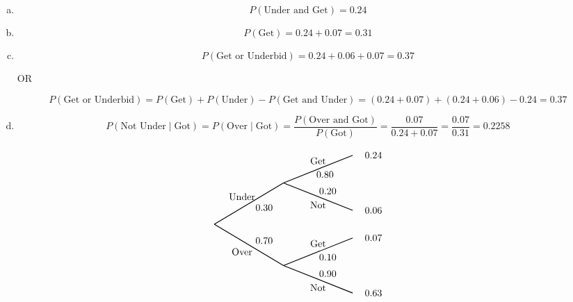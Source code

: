 \documentclass[11pt,letterpaper]{article}
\begin{document}
\sol
\begin{enumerate}[(a)]
\item 
	\[
	P(\text{Under and Get})= 0.24 
	\] \pspace

\item 
	\[
	P(\text{Get})= 0.24 + 0.07= 0.31
	\] \pspace

\item 
	\[
	P(\text{Get or Underbid})= 0.24 + 0.06 + 0.07= 0.37
	\]
		\begin{center} OR \end{center}
	\[
	P(\text{Get or Underbid})= P(\text{Get}) + P(\text{Under}) - P(\text{Get and Under})= (0.24 + 0.07) + (0.24 + 0.06) - 0.24= 0.37
	\] \pspace

\item 
	\[
	P(\text{Not Under} \;|\; \text{Got})= P(\text{Over} \;|\; \text{Got})= \dfrac{P(\text{Over and Got})}{P(\text{Got})}= \dfrac{0.07}{0.24 + 0.07}= \dfrac{0.07}{0.31}= 0.2258
	\]
\end{enumerate} \pspace

		\[
		\begin{tikzpicture}[scale= 1.0]
		\def\FirstUpLabel{Under}
		\def\FirstDownLabel{Over}
		\def\SecondUpLabel{Get}
		\def\SecondDownLabel{Not}
		\def\Up{$0.30$}
		\def\Down{$0.70$}
		\def\UpUp{$0.80$}
		\def\UpDown{$0.20$}
		\def\DownUp{$0.10$}
		\def\DownDown{$0.90$}
		\def\first{$0.24$}
		\def\second{$0.06$}
		\def\third{$0.07$}
		\def\fourth{$0.63$}
		
		\node at (1,1) {\FirstUpLabel};	
		\node at (1,-1) {\FirstDownLabel};	
		\node at (1.8,0.6) {\Up};
		\node at (1.8,-0.6) {\Down};
		\draw[thick] (0,0) -- (2.5,1.5);
		\draw[thick] (0,0) -- (2.5,-1.5);
		
		\node at (3.75,2.3) {\SecondUpLabel};
		\node at (3.75,0.7) {\SecondDownLabel};
		\node at (4,1.8) {\UpUp};
		\node at (4.1,1.2) {\UpDown};
		\node at (5.75,2.5) {\first};
		\node at (5.75,0.5) {\second};
		\draw[thick] (2.5,1.5) -- (5,2.5);
		\draw[thick] (2.5,1.5) -- (5,0.5);

		\node at (3.75,-0.7) {\SecondUpLabel};
		\node at (3.75,-2.3) {\SecondDownLabel};
		\node at (4.1,-1.2) {\DownUp};
		\node at (4.1,-1.8) {\DownDown};
		\node at (5.75,-0.5) {\third};	
		\node at (5.75,-2.5) {\fourth};	
		\draw[thick] (2.5,-1.5) -- (5,-0.5);
		\draw[thick] (2.5,-1.5) -- (5,-2.5);
		\end{tikzpicture}
		\]





\newpage
\end{document}
